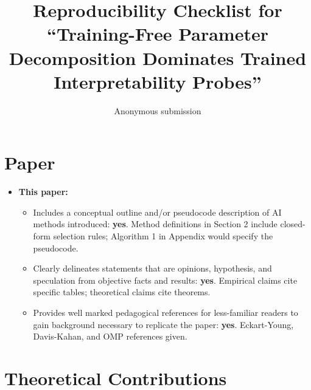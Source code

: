 \documentclass[letterpaper]{article}
\title{Reproducibility Checklist for
``Training-Free Parameter Decomposition Dominates Trained Interpretability Probes''}
\author{Anonymous submission}
\begin{document}
\maketitle

\section{Paper}

\begin{itemize}
\item \textbf{This paper:}
\begin{itemize}
\item Includes a conceptual outline and/or pseudocode description of AI methods introduced: \textbf{yes}. Method definitions in Section 2 include closed-form selection rules; Algorithm 1 in Appendix would specify the pseudocode.
\item Clearly delineates statements that are opinions, hypothesis, and speculation from objective facts and results: \textbf{yes}. Empirical claims cite specific tables; theoretical claims cite theorems.
\item Provides well marked pedagogical references for less-familiar readers to gain background necessary to replicate the paper: \textbf{yes}. Eckart-Young, Davis-Kahan, and OMP references given.
\end{itemize}
\end{itemize}

\section{Theoretical Contributions}
\end{document}
